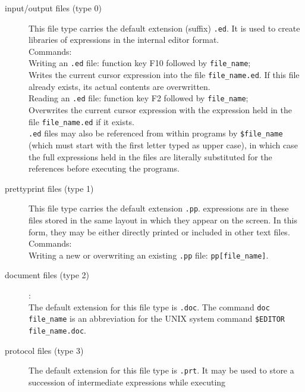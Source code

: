 \begin{description}
\begin{description}
\item[{\rm input/output files (type 0)}]$\;$\\$\;$\\
This file type carries the default extension (suffix) {\tt .ed}. It
 is used to create libraries of \kir expressions in the
 internal editor format. \\$\;$\\
Commands:\\$\;$\\
Writing an {\tt .ed} file: function key F10 followed by {\tt file\_name};\\
Writes the current cursor expression into the file {\tt file\_name.ed}. If this file already exists, its actual contents are overwritten.\\$\;$\\
Reading an {\tt .ed} file: function key F2 followed by {\tt file\_name};\\
Overwrites the current cursor expression with the expression held
 in the file {\tt file\_name.ed} if it exists.\\$\;$\\
{\tt .ed} files may also be referenced from within \kir programs
by {\tt \$file\_name} (which must start with the first letter typed as
upper case), in which case the full expressions held in the files are
 literally substituted for the references before executing the programs.
\item[{\rm prettyprint files (type 1)}]$\;$\\
This file type carries the default extension {\tt .pp}. \kir
 expressions are in these files stored in the same layout in which
 they appear on the screen. In this form, they may be either directly
 printed or included in other text files.\\$\;$\\
Commands:\\$\;$\\
Writing a new or overwriting an existing {\tt .pp} file: {\tt pp[file\_name]}.
\item[{\rm document files (type 2)}]:$\;$\\
The default extension for this file type is {\tt .doc}. The command 
{\tt doc file\_name} is an abbreviation for the UNIX system command
{\tt \$EDITOR file\_name.doc}. 
\item[{\rm protocol files (type 3)}]$\;$\\
The default extension for this file type is {\tt .prt}. It may be used to store a succession of intermediate \kir expressions while executing

\end{description}
\end{description}
